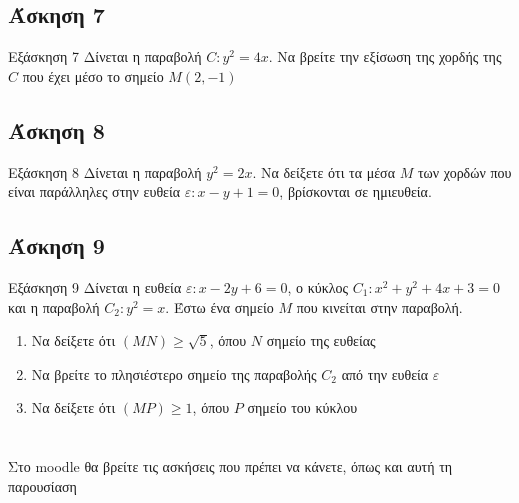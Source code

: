 \documentclass[greek]{beamer}
\begin{document}
\subsection{Άσκηση 7}
\begin{frame}[label=Άσκηση7,t]{Εξάσκηση 7}
 Δίνεται η παραβολή $C:y^2=4x$. Να βρείτε την εξίσωση της χορδής της $C$ που έχει μέσο το σημείο $Μ(2,-1)$

\end{frame}

\subsection{Άσκηση 8}
\begin{frame}[label=Άσκηση8,t]{Εξάσκηση 8}
 Δίνεται η παραβολή $y^2=2x$. Να δείξετε ότι τα μέσα $Μ$ των χορδών που είναι παράλληλες στην ευθεία $ε:x-y+1=0$, βρίσκονται σε ημιευθεία.

\end{frame}

\subsection{Άσκηση 9}
\begin{frame}[label=Άσκηση9,t]{Εξάσκηση 9}
 Δίνεται η ευθεία $ε:x-2y+6=0$, ο κύκλος $C_1:x^2+y^2+4x+3=0$ και η παραβολή $C_2:y^2=x$. Έστω ένα σημείο $Μ$ που κινείται στην παραβολή.
 \begin{enumerate}
   \item<1-> Να δείξετε ότι $(ΜΝ)\ge \sqrt{5}$, όπου $Ν$ σημείο της ευθείας
   \item<2-> Να βρείτε το πλησιέστερο σημείο της παραβολής $C_2$ από την ευθεία $ε$
   \item<3-> Να δείξετε ότι $(ΜΡ)\ge 1$, όπου $Ρ$ σημείο του κύκλου
 \end{enumerate}

\end{frame}

\appendix

\section{}
\begin{frame}
 Στο moodle θα βρείτε τις ασκήσεις που πρέπει να κάνετε, όπως και αυτή τη παρουσίαση
\end{frame}
\end{document}
